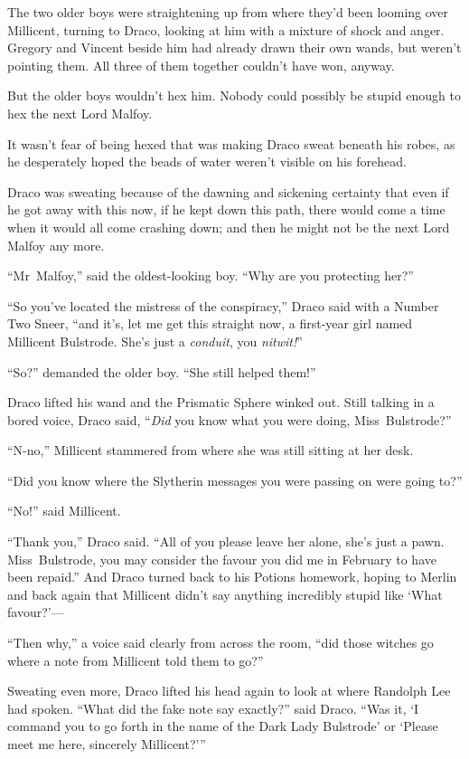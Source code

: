 The two older boys were straightening up from where they’d been looming over Millicent, turning to Draco, looking at him with a mixture of shock and anger. Gregory and Vincent beside him had already drawn their own wands, but weren’t pointing them. All three of them together couldn’t have won, anyway.

But the older boys wouldn’t hex him. Nobody could possibly be stupid enough to hex the next Lord Malfoy.

It wasn’t fear of being hexed that was making Draco sweat beneath his robes, as he desperately hoped the beads of water weren’t visible on his forehead.

Draco was sweating because of the dawning and sickening certainty that even if he got away with this now, if he kept down this path, there would come a time when it would all come crashing down; and then he might not be the next Lord Malfoy any more.

“Mr~Malfoy,” said the oldest-looking boy. “Why are you protecting her?”

“So you’ve located the mistress of the conspiracy,” Draco said with a Number Two Sneer, “and it’s, let me get this straight now, a first-year girl named Millicent Bulstrode. She’s just a \emph{conduit}, you \emph{nitwit!}”

“So?” demanded the older boy. “She still helped them!”

Draco lifted his wand and the Prismatic Sphere winked out. Still talking in a bored voice, Draco said, “\emph{Did} you know what you were doing, Miss~Bulstrode?”

“N-no,” Millicent stammered from where she was still sitting at her desk.

“Did you know where the Slytherin messages you were passing on were going to?”

“No!” said Millicent.

“Thank you,” Draco said. “All of you please leave her alone, she’s just a pawn. Miss~Bulstrode, you may consider the favour you did me in February to have been repaid.” And Draco turned back to his Potions homework, hoping to Merlin and back again that Millicent didn’t say anything incredibly stupid like ‘What favour?’—

“Then why,” a voice said clearly from across the room, “did those witches go where a note from Millicent told them to go?”

Sweating even more, Draco lifted his head again to look at where Randolph Lee had spoken. “What did the fake note say exactly?” said Draco. “Was it, ‘I command you to go forth in the name of the Dark Lady Bulstrode’ or ‘Please meet me here, sincerely Millicent?’”

